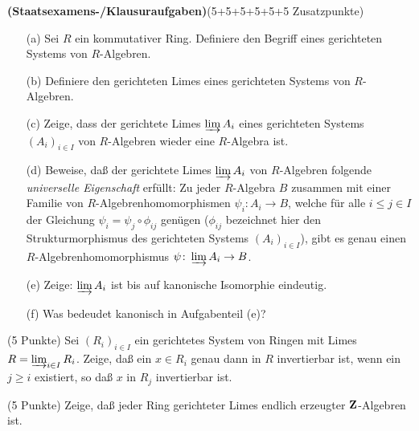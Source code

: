 \documentclass{algsheet}
\author{Dipl.-Math.~Franz Vogler}
\date{20.~Juni 2011}
\begin{document}
                \maketitle



\begin{exercise}\textbf{(Staatsexamens-/Klausuraufgaben)}(5+5+5+5+5+5 Zusatzpunkte)\vspace{-1ex}
\begin{itemize}
 \item [(a)] Sei \(R\) ein kommutativer Ring. Definiere den Begriff eines gerichteten
    Systems von \(R\)-Algebren.
 \item [(b)] Definiere den gerichteten Limes eines gerichteten Systems von $R$-Algebren.
 \item [(c)] Zeige, dass der gerichtete Limes $\varinjlim A_i$ eines gerichteten Systems $(A_i)_{i\in I}$ von $R$-Algebren wieder eine $R$-Algebra ist.
 \item [(d)] Beweise, daß der gerichtete Limes $\varinjlim A_i$ von $R$-Algebren folgende \emph{universelle Eigenschaft} erfüllt:
             \newline
             Zu jeder $R$-Algebra $B$ zusammen mit einer Familie von $R$-Algebrenhomomorphismen $\psi_i \colon A_i \rightarrow B$, welche für alle $i\leq j \in I$ der Gleichung $\psi_i = \psi_j\circ\phi_{ij}$ genügen ($\phi_{ij}$ bezeichnet hier den Strukturmorphismus des gerichteten Systems $(A_i)_{i\in I}$), gibt es genau einen $R$-Algebrenhomomorphismus $\psi \colon \varinjlim A_i \rightarrow B$.
 \item [(e)] Zeige: $\varinjlim A_i$ ist bis auf kanonische Isomorphie eindeutig.
 \item [(f)] Was bedeudet \glqq kanonisch\grqq\; in Aufgabenteil (e)? 
 \end{itemize}
\end{exercise}




\begin{exercise}(5 Punkte)\newline
   Sei \((R_i)_{i \in I}\) ein gerichtetes System von Ringen mit Limes
    \(R = \varinjlim_{i \in I} R_i\). Zeige, daß ein \(x \in R_i\) genau dann in
    \(R\) invertierbar ist, wenn ein \(j \ge i\) existiert, so daß \(x\) in \(R_j\)
    invertierbar ist.
\end{exercise}





\begin{exercise}(5 Punkte)\newline
  Zeige, daß jeder Ring gerichteter Limes endlich erzeugter \(\mathbf Z\)-Algebren
  ist.
\end{exercise}
\end{document}
